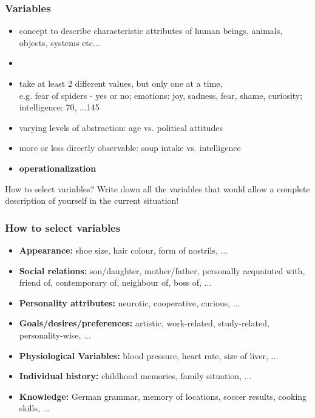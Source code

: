 \documentclass[]{beamer}
\begin{document}
\begin{frame}
\frametitle{Variables}
\begin{itemize}
 \item concept to describe characteristic attributes of human beings, animals, objects, systems etc...
 \item[]
 \item <2-> take at least 2 different values, but only one at a time, \\ 
e.g. fear of spiders - yes or no; emotions: joy, sadness, fear, shame, curiosity; intelligence: 70, ...145
 \item<2-> varying levels of abstraction: age vs. political attitudes
 \item<2-> more or less directly observable: soup intake vs. intelligence
 \item<2->[$\rightarrow$] \textbf{operationalization}
\end{itemize}
\end{frame}


\begin{frame}
 
\begin{exampleblock}{How to select variables?}
Write down all the variables that would allow a complete description of yourself in the current situation! 
\end{exampleblock}
\end{frame}

\begin{frame}
 \frametitle{How to select variables}
\begin{itemize}
 \item []\textbf{Appearance:} shoe size, hair colour, form of nostrils, ...
 \item []\textbf{Social relations:} son/daughter, mother/father, personally
acquainted with, friend of, contemporary of, neighbour of, boss of, ...
 \item []\textbf{Personality attributes:} neurotic, cooperative, curious, ...
 \item []\textbf{Goals/desires/preferences:} artistic, work-related,
study-related, personality-wise, ...
 \item []\textbf{Physiological Variables:} blood pressure, heart rate, size of
liver, ...
 \item []\textbf{Individual history:} childhood memories, family situation, ...
 \item []\textbf{Knowledge:} German grammar, memory of locations, soccer
results,
cooking skills, ...
\end{itemize}
\end{frame}
\end{document}
